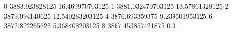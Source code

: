 0 3883.923828125 16.469970703125
1 3881.032470703125 13.57861328125
2 3879.994140625 12.540283203125
4 3876.693359375 9.239501953125
6 3872.822265625 5.368408203125
8 3867.453857421875 0.0
